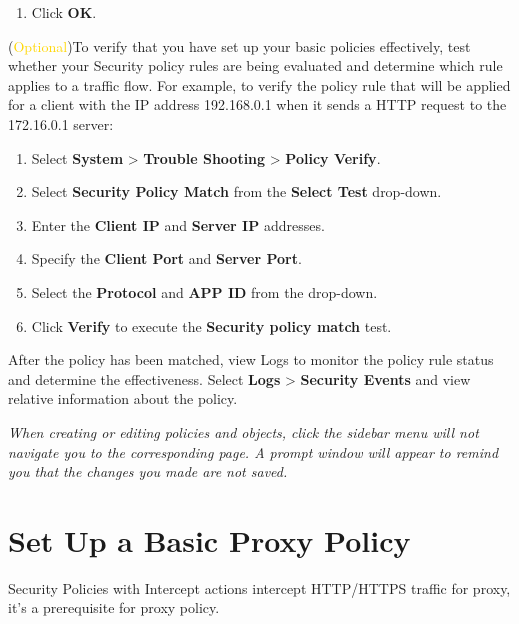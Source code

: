 \begin{description}
\begin{enumerate}
        \item Click \textbf{OK}.
    \end{enumerate}
    \item[STEP 2.] (\textcolor{gold}{Optional})To verify that you have set up your basic policies effectively, test whether your Security policy rules are being evaluated 
    and determine which rule applies to a traffic flow. For example, to verify the policy rule that will be applied for a client with the IP address 192.168.0.1 
    when it sends a HTTP request to the 172.16.0.1 server:
    \begin{enumerate} 
        \item Select \textbf{System} > \textbf{Trouble Shooting} > \textbf{Policy Verify}.
        \item	Select \textbf{Security Policy Match} from the \textbf{Select Test} drop-down. 
        \item	Enter the \textbf{Client IP} and \textbf{Server IP} addresses.
        \item	Specify the \textbf{Client Port} and \textbf{Server Port}.
        \item	Select the \textbf{Protocol} and \textbf{APP ID} from the drop-down.
        \item	Click \textbf{Verify} to execute the \textbf{Security policy match} test.    
    \end{enumerate}
    \item[STEP 3.] After the policy has been matched, view Logs to monitor the policy rule status and determine the effectiveness. 
    Select \textbf{Logs} > \textbf{Security Events} and view relative information about the policy.
\end{description}


\notemark\textit{When creating or editing policies and objects, click the sidebar menu will not navigate you to the corresponding page. 
A prompt window will appear to remind you that the changes you made are not saved.}


\section*{\hypertarget{link:Set Up a Basic Proxy Policy}{Set Up a Basic Proxy Policy}}
\label{sec:intro:proxy}

Security Policies with Intercept actions intercept HTTP/HTTPS traffic for proxy, it's a prerequisite for proxy policy. 


